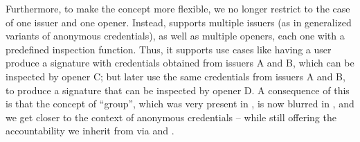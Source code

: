 Furthermore, to make the concept more flexible, we no longer restrict to the
case of one issuer and one opener. Instead, \UAS supports multiple issuers (as
in generalized variants of anonymous credentials), as well as multiple openers,
each one with a predefined inspection function. Thus, it supports use cases like
having a user produce a signature with credentials obtained from issuers A and
B, which can be inspected by opener C; but later use the same credentials
from issuers A and B, to produce a signature that can be inspected by opener D.
A consequence of this is that the concept of ``group'', which was very present
in \GSAC, is now blurred in \UAS, and we get closer to the context of anonymous
credentials -- while still offering the accountability we inherit from \GSAC
via \Open and \Judge.







